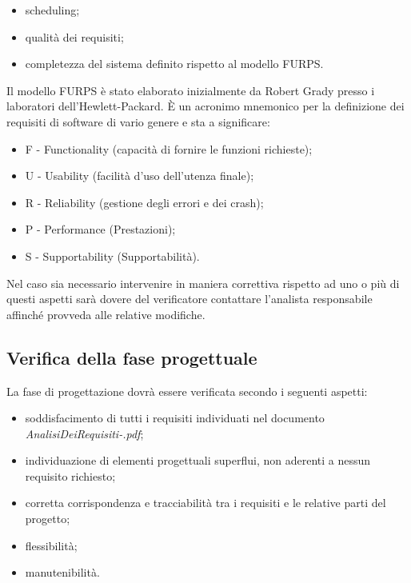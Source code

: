 \begin{itemize}

\item scheduling;
\item qualit\`a dei requisiti;
\item completezza del sistema definito rispetto al modello FURPS.
 

\end{itemize}

Il modello FURPS \`e stato elaborato inizialmente da Robert Grady presso i
laboratori dell'Hewlett-Packard. \`E un acronimo mnemonico per la definizione dei requisiti
di software di vario genere e sta a significare:

\begin{itemize}

\item F - Functionality (capacit\`a di fornire le funzioni richieste);
\item U - Usability (facilit\`a d'uso dell'utenza finale);
\item R - Reliability (gestione degli errori e dei crash);
\item P - Performance (Prestazioni);
\item S - Supportability (Supportabilit\`a).
\end{itemize}


Nel caso sia necessario intervenire in maniera correttiva rispetto ad uno o
pi\`u di questi aspetti sar\`a dovere del verificatore contattare l'analista
responsabile affinch\'e provveda alle relative modifiche.



\subsection{Verifica della fase progettuale}

La fase di progettazione dovr\`a essere verificata secondo i seguenti aspetti:

\begin{itemize}

\item soddisfacimento di tutti i requisiti individuati nel documento
\emph{AnalisiDeiRequisiti-\versioneAR.pdf};
\item individuazione di elementi progettuali superflui, non aderenti a nessun
requisito richiesto;
\item corretta corrispondenza e tracciabilit\`a tra i requisiti e le relative
parti del progetto;
\item flessibilit\`a;
\item manutenibilit\`a.

\end{itemize}

